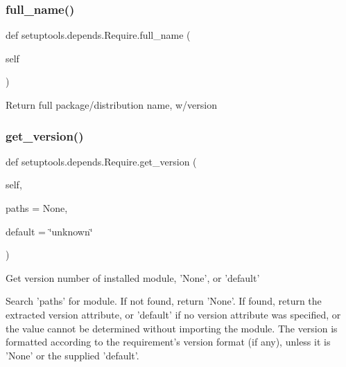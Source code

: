 \subsubsection{\texorpdfstring{full\+\_\+name()}{full\_name()}}
{\footnotesize\ttfamily def setuptools.\+depends.\+Require.\+full\+\_\+name (\begin{DoxyParamCaption}\item[{}]{self }\end{DoxyParamCaption})}

\begin{DoxyVerb}Return full package/distribution name, w/version\end{DoxyVerb}
 \mbox{\label{classsetuptools_1_1depends_1_1_require_aa726406933884cdfc0a0a13b01920734}} 
\subsubsection{\texorpdfstring{get\+\_\+version()}{get\_version()}}
{\footnotesize\ttfamily def setuptools.\+depends.\+Require.\+get\+\_\+version (\begin{DoxyParamCaption}\item[{}]{self,  }\item[{}]{paths = {\ttfamily None},  }\item[{}]{default = {\ttfamily \char`\"{}unknown\char`\"{}} }\end{DoxyParamCaption})}

\begin{DoxyVerb}Get version number of installed module, 'None', or 'default'

Search 'paths' for module.  If not found, return 'None'.  If found,
return the extracted version attribute, or 'default' if no version
attribute was specified, or the value cannot be determined without
importing the module.  The version is formatted according to the
requirement's version format (if any), unless it is 'None' or the
supplied 'default'.
\end{DoxyVerb}
 \mbox{\label{classsetuptools_1_1depends_1_1_require_aca429ced44bae94f3ff8af55745d60ed}} 
